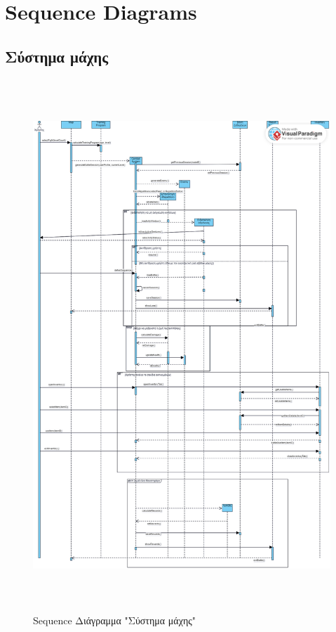 \newpage
\section{Sequence Diagrams}
\subsection{Σύστημα μάχης}
\begin{figure}[!htb]
  \begin{center}
    \includegraphics[width=18.5cm,height=20cm]{sequence_battle.png}
    \caption{Sequence Διάγραμμα "Σύστημα μάχης"}
    \label{}
    \end{center}
\end{figure}
\newpage

